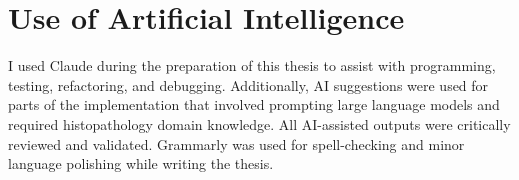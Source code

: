 \appendix
\chapter{Use of Artificial Intelligence}
\label{appendix:ai-usage}

I used Claude during the preparation of this thesis to assist with programming, testing, refactoring, and debugging. Additionally, AI suggestions were used for parts of the implementation that involved prompting large language models and required histopathology domain knowledge. All AI-assisted outputs were critically reviewed and validated. Grammarly was used for spell-checking and minor language polishing while writing the thesis.
